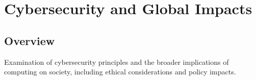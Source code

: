 \chapter{Cybersecurity and Global Impacts}

\section*{Overview}
Examination of cybersecurity principles and the broader implications of computing on society, including ethical considerations and policy impacts.

